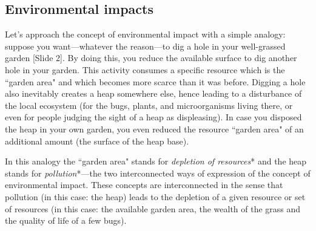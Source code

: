 \documentclass{article}
\begin{document}
\subsection{Environmental impacts}
\label{sec:EnvironmentalImpacts}

Let's approach the concept of environmental impact with a simple analogy: suppose you want---whatever the reason---to dig a hole in your well-grassed garden {\color{blue}[Slide 2]}. By doing this, you reduce the available surface to dig another hole in your garden. This activity consumes a specific resource which is the ``garden area" and which becomes more scarce than it was before. Digging a hole also inevitably creates a heap somewhere else, hence leading to a disturbance of the local ecosystem (for the bugs, plants, and microorganisms living there, or even for people judging the sight of a heap as displeasing). In case you disposed the heap in your own garden, you even reduced the resource ``garden area" of an additional amount (the surface of the heap base). 

In this analogy the ``garden area" stands for \emph{depletion of resources}* and the heap stands for \emph{pollution}*---the two interconnected ways of expression of the concept of environmental impact. These concepts are interconnected in the sense that pollution (in this case: the heap) leads to the depletion of a given resource or set of resources (in this case: the available garden area, the wealth of the grass and the quality of life of a few bugs).  
\end{document}
